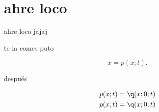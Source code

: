 


\section{ahre loco}
	
ahre loco jajaj

te la comes puto

\[
x = p(x;t)
.\] 

después 

\[
\begin{align*}
   p(x;t) &= \q(x;0;t) \\
   p(x;t) &= \q(x;0;t)
\end{align*}
\] 
